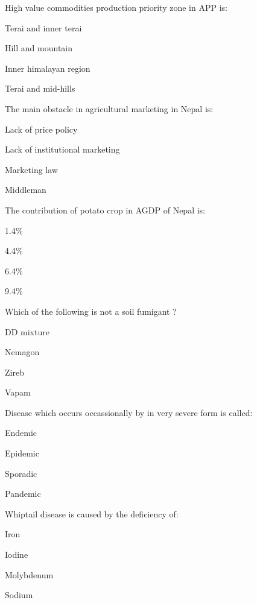 \begin{questions}
\question High value commodities production priority zone in APP is:
  \begin{items}
  \item Terai and inner terai
  \item Hill and mountain
  \item Inner himalayan region
  \item Terai and mid-hills
  \end{items}

\question The main obstacle in agricultural marketing in Nepal is:
  \begin{items}
  \item Lack of price policy
  \item Lack of institutional marketing
  \item Marketing law
  \item Middleman
  \end{items}

\question The contribution of potato crop in AGDP of Nepal is:
  \begin{items}
  \item 1.4\%
  \item 4.4\%
  \item 6.4\%
  \item 9.4\%
  \end{items}

\question Which of the following is not a soil fumigant ?
  \begin{items}
  \item DD mixture
  \item Nemagon
  \item Zireb
  \item Vapam
  \end{items}

\question Disease which occurs occassionally by in very severe form is called:
  \begin{items}
  \item Endemic
  \item Epidemic
  \item Sporadic
  \item Pandemic
  \end{items}

\question Whiptail disease is caused by the deficiency of:
  \begin{items}
  \item Iron
  \item Iodine
  \item Molybdenum
  \item Sodium
  \end{items}


\end{questions}
